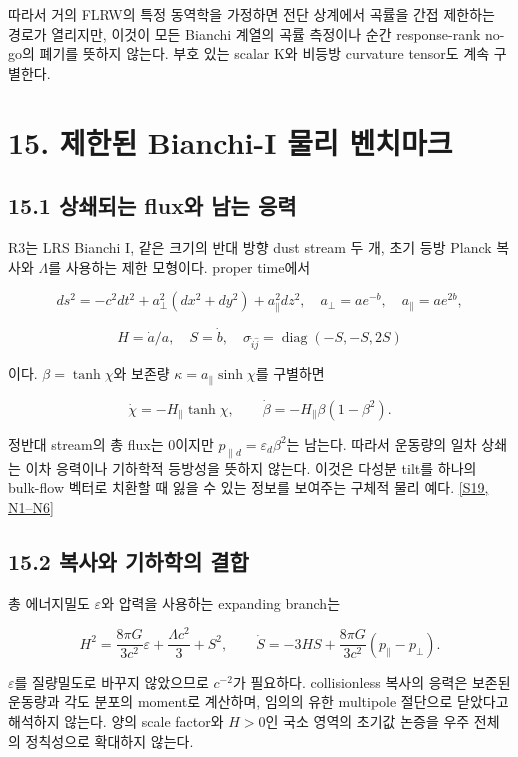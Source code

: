 \documentclass[11pt,a4paper]{article}
\begin{document}
따라서 거의 FLRW의 특정 동역학을 가정하면 전단 상계에서 곡률을 간접 제한하는 경로가 열리지만, 이것이 모든 Bianchi 계열의 곡률 측정이나 순간 response-rank no-go의 폐기를 뜻하지 않는다. 부호 있는 scalar K와 비등방 curvature tensor도 계속 구별한다.


\hypertarget{s15}{}

\section*{15. 제한된 Bianchi-I 물리 벤치마크}


\subsection*{15.1 상쇄되는 flux와 남는 응력}

R3는 LRS Bianchi I, 같은 크기의 반대 방향 dust stream 두 개, 초기 등방 Planck 복사와 \(\Lambda\)를 사용하는 제한 모형이다. proper time에서


\[
ds^2=-c^2dt^2+a_\perp^2(dx^2+dy^2)+a_\parallel^2dz^2,
\quad a_\perp=ae^{-b},\quad a_\parallel=ae^{2b},
\]

\[
H=\dot a/a,\quad S=\dot b,\quad
\sigma_{\hat i\hat j}=\operatorname{diag}(-S,-S,2S)
\]

이다. \(\beta=\tanh\chi\)와 보존량 \(\kappa=a_\parallel\sinh\chi\)를 구별하면


\[
\dot\chi=-H_\parallel\tanh\chi,\qquad
\dot\beta=-H_\parallel\beta(1-\beta^2).
\]

정반대 stream의 총 flux는 0이지만 \(p_{\parallel d}=\varepsilon_d\beta^2\)는 남는다. 따라서 운동량의 일차 상쇄는 이차 응력이나 기하학적 등방성을 뜻하지 않는다. 이것은 다성분 tilt를 하나의 bulk-flow 벡터로 치환할 때 잃을 수 있는 정보를 보여주는 구체적 물리 예다. \hyperlink{src:S19}{[S19, N1–N6]}


\subsection*{15.2 복사와 기하학의 결합}

총 에너지밀도 \(\varepsilon\)와 압력을 사용하는 expanding branch는


\[
H^2=\frac{8\pi G}{3c^2}\varepsilon+\frac{\Lambda c^2}{3}+S^2,
\qquad
\dot S=-3HS+\frac{8\pi G}{3c^2}(p_\parallel-p_\perp).
\]

\(\varepsilon\)를 질량밀도로 바꾸지 않았으므로 \(c^{-2}\)가 필요하다. collisionless 복사의 응력은 보존된 운동량과 각도 분포의 moment로 계산하며, 임의의 유한 multipole 절단으로 닫았다고 해석하지 않는다. 양의 scale factor와 \(H>0\)인 국소 영역의 초기값 논증을 우주 전체의 정칙성으로 확대하지 않는다.
\end{document}
